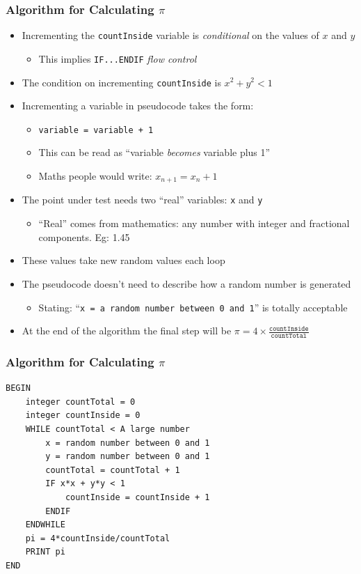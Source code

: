 \documentclass[14pt]{beamer}
\begin{document}
\begin{frame}
\frametitle{Algorithm for Calculating $\pi$}
\begin{itemize}
\item Incrementing the \texttt{countInside} variable is \textit{conditional} on the values of $x$ and $y$
	\begin{itemize}
		\item This implies \texttt{IF...ENDIF} \textit{flow control}
	\end{itemize}
\item The condition on incrementing \texttt{countInside} is $x^2 + y^2 < 1$
\item Incrementing a variable in pseudocode takes the form:
	\begin{itemize}
		\item \texttt{variable = variable + 1}
		\item This can be read as ``variable \textit{becomes} variable plus 1''
		\item Maths people would write: $x_{n+1} = x_n + 1$
	\end{itemize}
\end{itemize}
\end{frame}

\begin{frame}
\begin{itemize}
\item The point under test needs two ``real'' variables: \texttt{x} and \texttt{y}
	\begin{itemize}
 		\item ``Real'' comes from mathematics: any number with integer and fractional components. Eg: 1.45
	\end{itemize}
\item These values take new random values each loop
\item The pseudocode doesn't need to describe how a random number is generated
	\begin{itemize}
		\item Stating: ``\texttt{x = a random number between 0 and 1}'' is totally acceptable
	\end{itemize}
\item At the end of the algorithm the final step will be $\pi = 4\times \frac{\texttt{countInside}}{\texttt{countTotal}}$
\end{itemize}
\end{frame}


\begin{frame}[fragile]
\frametitle{Algorithm for Calculating $\pi$}
\begin{lstlisting}[style=pseudo]
BEGIN
	integer countTotal = 0
	integer countInside = 0
	WHILE countTotal < A large number
		x = random number between 0 and 1
		y = random number between 0 and 1
		countTotal = countTotal + 1
		IF x*x + y*y < 1
			countInside = countInside + 1
		ENDIF
	ENDWHILE
	pi = 4*countInside/countTotal
	PRINT pi
END
\end{lstlisting}
\end{frame}
\end{document}
